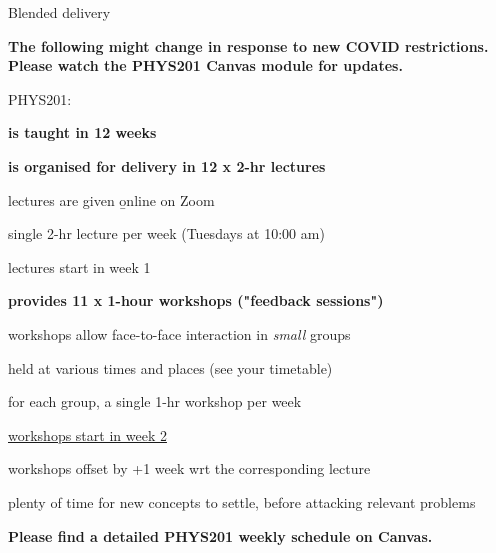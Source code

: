 %
%
%

\begin{frame}{Blended delivery}

\begin{block001}{}
\begin{center}
{\bf \color{red} \scriptsize
 The following might change in response to new COVID restrictions.\\
 Please watch the PHYS201 Canvas module for updates.\\
}
\end{center}
\end{block001}

PHYS201:
\begin{itemize}
{\small
\item {\bf is taught in 12 weeks}
\vspace{0.1cm}
\item {\bf is organised for delivery in 12 x 2-hr lectures}
  \begin{itemize}
  {\small
     \item lectures are given {\b online} on Zoom
     \item single 2-hr lecture per week (Tuesdays at 10:00 am)
     \item lectures start in week 1
  }
  \end{itemize}
\vspace{0.1cm}
\item {\bf provides 11 x 1-hour workshops ("feedback sessions")}
\begin{itemize}
{\small
   \item workshops allow face-to-face interaction in {\em small} groups
   \item held at various times and places (see your timetable)
   \item for each group, a single 1-hr workshop per week
   \item {\underline{workshops start in week 2}}
   \begin{itemize}
   {\scriptsize
     \item workshops offset by +1 week wrt the corresponding lecture
     \item plenty of time for new concepts to settle, before
        attacking relevant problems
   }
   \end{itemize}
}
\end{itemize}
}
\end{itemize}

\begin{center}
{\bf
Please find a detailed PHYS201 weekly schedule on Canvas.\\
}
\end{center}

\end{frame}

